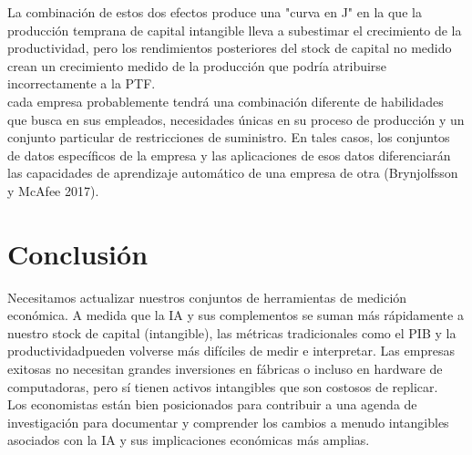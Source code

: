 La combinación de estos dos efectos produce una "curva en J" en la que la producción temprana de capital intangible lleva a subestimar el crecimiento de la productividad, pero los rendimientos posteriores del stock de capital no medido crean un crecimiento medido de la producción que podría atribuirse incorrectamente a la PTF.\\
cada empresa probablemente tendrá una combinación diferente de habilidades que busca en sus empleados, necesidades únicas en su proceso de producción y un conjunto particular de restricciones de suministro. En tales casos, los conjuntos de datos específicos de la empresa y las aplicaciones de esos datos diferenciarán las capacidades de aprendizaje automático de una empresa de otra (Brynjolfsson y McAfee 2017).

\section{Conclusión}
Necesitamos actualizar nuestros conjuntos de herramientas de medición económica. A medida que la IA y sus complementos se suman más rápidamente a nuestro stock de capital (intangible), las métricas tradicionales como el PIB y la productividadpueden volverse más difíciles de medir e interpretar. Las empresas exitosas no necesitan grandes inversiones en fábricas o incluso en hardware de computadoras, pero sí tienen activos intangibles que son costosos de replicar.\\
Los economistas están bien posicionados para contribuir a una agenda de investigación para documentar y comprender los cambios a menudo intangibles asociados con la IA y sus implicaciones económicas más amplias.




